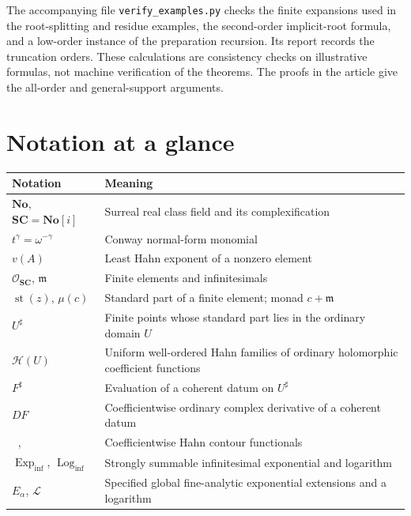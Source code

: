 \documentclass[11pt,letterpaper]{article}
\theoremstyle{definition}
\theoremstyle{remark}
\newcommand{\No}{\mathbf{No}}
\newcommand{\SC}{\mathbf{SC}}
\newcommand{\OO}{\mathcal O}
\newcommand{\HH}{\mathcal H}
\newcommand{\mm}{\mathfrak m}
\newcommand{\st}{\operatorname{st}}
\newcommand{\Logi}{\operatorname{Log}_{\mathrm{inf}}}
\newcommand{\Expi}{\operatorname{Exp}_{\mathrm{inf}}}
\newcommand{\HInt}{\mathop{\int^{\!H}}\nolimits}
\newcommand{\HCoint}{\mathop{\oint^{\!H}}\nolimits}
\newcommand{\sh}{^{\sharp}}
\numberwithin{equation}{section}
\begin{document}
The accompanying file \texttt{verify\_examples.py} checks the finite expansions used in the root-splitting and residue examples, the second-order implicit-root formula, and a low-order instance of the preparation recursion. Its report records the truncation orders. These calculations are consistency checks on illustrative formulas, not machine verification of the theorems. The proofs in the article give the all-order and general-support arguments.

\section{Notation at a glance}
\begin{center}\small
\begin{tabular}{@{}L{0.24\textwidth}L{0.67\textwidth}@{}}
\toprule
Notation & Meaning\\
\midrule
$\No$, $\SC=\No[i]$ & Surreal real class field and its complexification\\[0.3em]
$t^\gamma=\omega^{-\gamma}$ & Conway normal-form monomial\\[0.3em]
$v(A)$ & Least Hahn exponent of a nonzero element\\[0.3em]
$\OO_{\SC}$, $\mm$ & Finite elements and infinitesimals\\[0.3em]
$\st(z)$, $\mu(c)$ & Standard part of a finite element; monad $c+\mm$\\[0.3em]
$U\sh$ & Finite points whose standard part lies in the ordinary domain $U$\\[0.3em]
$\HH(U)$ & Uniform well-ordered Hahn families of ordinary holomorphic coefficient functions\\[0.3em]
$F\sh$ & Evaluation of a coherent datum on $U\sh$\\[0.3em]
$D F$ & Coefficientwise ordinary complex derivative of a coherent datum\\[0.3em]
$\HInt$, $\HCoint$ & Coefficientwise Hahn contour functionals\\[0.3em]
$\Expi$, $\Logi$ & Strongly summable infinitesimal exponential and logarithm\\[0.3em]
$E_\alpha$, $\mathcal L$ & Specified global fine-analytic exponential extensions and a logarithm\\
\bottomrule
\end{tabular}
\end{center}
\end{document}
